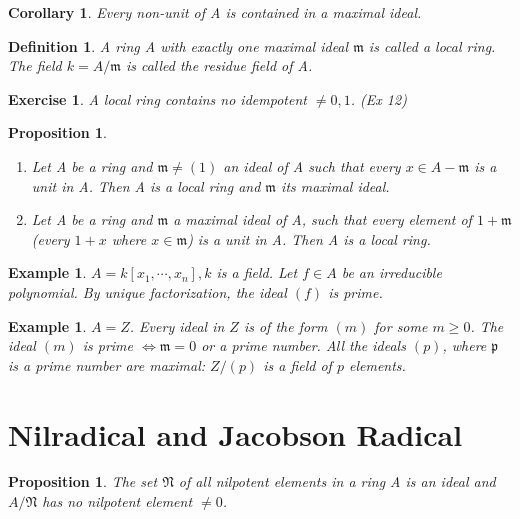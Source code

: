 \documentclass[]{report}
\newtheorem{prop}[theorem]{Proposition}
\newtheorem{corollary}{Corollary}[theorem]
\newtheorem{defn}[theorem]{Definition}
\newtheorem{examples}[theorem]{Example}
\newtheorem{exercise}[theorem]{Exercise}
\begin{document}
\begin{corollary}
    Every non-unit of A is contained in a maximal ideal.
\end{corollary}

\begin{defn}
    A ring A with exactly one maximal ideal $\mathfrak{m}$ is called a local ring. The field $k=A/\mathfrak{m}$ is called the residue field of A.
\end{defn}

\begin{exercise}
    A local ring contains no idempotent $\neq 0,1$. (Ex 12)
\end{exercise}

\begin{prop}
    \begin{enumerate}
        \item Let A be a ring and $\mathfrak{m} \neq (1)$ an ideal of A such that every $x\in A-\mathfrak{m}$ is a unit in A. Then A is a local ring and $\mathfrak{m}$ its maximal ideal. 
        \item Let A be a ring and $\mathfrak{m}$ a maximal ideal of A, such that every element of $\mathfrak{1+m}$ (every $1+x$ where $x\in \mathfrak{m}$) is a unit in A. Then A is a local ring.
    \end{enumerate}
\end{prop}

\begin{examples}
     $A = k[x_1, \cdots, x_n], k$ is a field. Let $f\in A$ be an irreducible polynomial. By unique factorization, the ideal $(f)$ is prime. 
 \end{examples}
 \begin{examples}
 $A = Z$. Every ideal in $Z$ is of the form $(m)$ for some $m\geq 0$. The ideal $(m)$ is prime $\Leftrightarrow \mathfrak{m} = 0$ or a prime number. All the ideals $(p)$, where $\mathfrak{p}$ is a prime number are maximal: $Z/(p)$ is a field of $p$ elements.
\end{examples}

\section{Nilradical and Jacobson Radical}

\begin{prop}
    The set $\mathfrak{N}$ of all nilpotent elements in a ring A is an ideal and $A/\mathfrak{N}$ has no nilpotent element $\neq 0$.
\end{prop}
\end{document}
